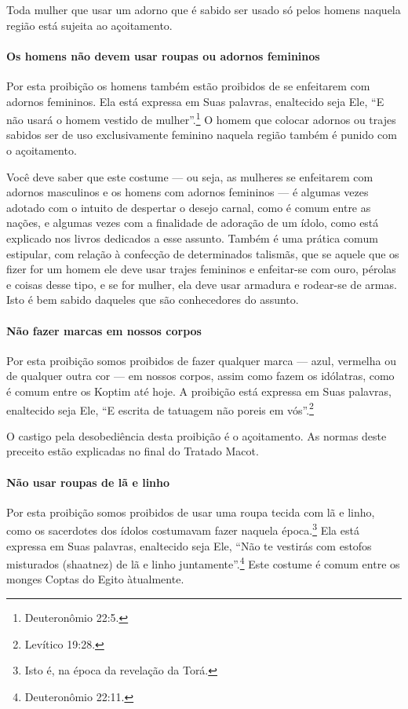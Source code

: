 Toda mulher que usar um adorno que é sabido ser usado só pelos homens
naquela região está sujeita ao açoitamento.

\paragraph{Os homens não devem usar roupas ou adornos femininos}

Por esta proibição os homens também estão proibidos de se enfeitarem
com adornos femininos. Ela está expressa em Suas palavras, enaltecido
seja Ele, ``E não usará o homem vestido de mulher''.\footnote{Deuteronômio
22:5.} O homem que colocar adornos ou trajes sabidos ser de uso
exclusivamente feminino naquela região também é punido com o
açoitamento.

Você deve saber que este costume --- ou seja, as mulheres se enfeitarem
com adornos masculinos e os homens com adornos femininos --- é algumas
vezes adotado com o intuito de despertar o desejo carnal, como é comum
entre as nações, e algumas vezes com a finalidade de adoração de um
ídolo, como está explicado nos livros dedicados a esse assunto. Também é
uma prática comum estipular, com relação à confecção de determinados
talismãs, que se aquele que os fizer for um homem ele deve usar trajes
femininos e enfeitar-se com ouro, pérolas e coisas desse tipo, e se for
mulher, ela deve usar armadura e rodear-se de armas. Isto é bem sabido
daqueles que são conhecedores do assunto.

\paragraph{Não fazer marcas em nossos corpos}

Por esta proibição somos proibidos de fazer qualquer marca --- azul,
vermelha ou de qualquer outra cor --- em nossos corpos, assim como fazem
os idólatras, como é comum entre os Koptim até hoje. A proibição está
expressa em Suas palavras, enaltecido seja Ele, ``E escrita de tatuagem
não poreis em vós''.\footnote{Levítico 19:28.}

O castigo pela desobediência desta proibição é o açoitamento. As normas
deste preceito estão explicadas no final do Tratado Macot.

\paragraph{Não usar roupas de lã e linho}

Por esta proibição somos proibidos de usar uma roupa tecida com lã e
linho, como os sacerdotes dos ídolos costumavam fazer naquela
época.\footnote{Isto é, na época da revelação da Torá.} Ela está expressa em Suas palavras,
enaltecido seja Ele, ``Não te vestirás com estofos misturados (shaatnez)
de lã e linho juntamente''.\footnote{Deuteronômio 22:11.} Este costume é comum
entre os monges Coptas do Egito àtualmente.

